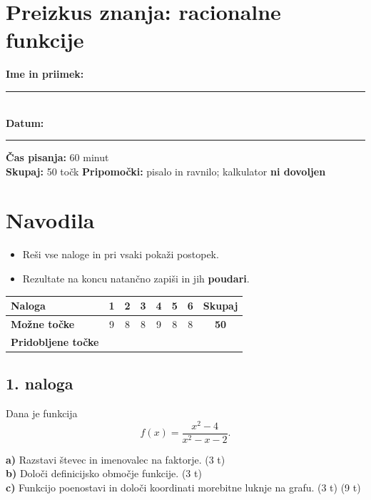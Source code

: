 \documentclass[11pt]{article}
\begin{document}
\renewcommand{\arraystretch}{1.2}

\section*{Preizkus znanja: racionalne funkcije}

\textbf{Ime in priimek:} \rule{6cm}{0.4pt}  \\
\textbf{Datum:} \rule{3cm}{0.4pt}  \hfill \textbf{Čas pisanja:} 60 minut \\
\textbf{Skupaj:} 50 točk  \hfill \textbf{Pripomočki:} pisalo in ravnilo; kalkulator \textbf{ni dovoljen}

\vspace{0.5cm}

\section*{Navodila}

\begin{itemize}
  \item Reši vse naloge in pri vsaki pokaži postopek.
  \item Rezultate na koncu natančno zapiši in jih \textbf{poudari}.
\end{itemize}
\vspace{0.2cm}

\begin{tabular}{|>{\raggedright\arraybackslash}p{2.7cm}|*{6}{c|}c|}
\hline
\textbf{Naloga} & 1 & 2 & 3 & 4 & 5 & 6 & \textbf{Skupaj} \\
\hline
\textbf{Možne točke} & 9 & 8 & 8 & 9 & 8 & 8 & \textbf{50} \\
\hline
\textbf{Pridobljene točke} &  &  &  &  &  &  &  \\
\hline
\end{tabular}

\subsection*{1. naloga}

Dana je funkcija
\[
 f(x)=\frac{x^2-4}{x^2-x-2}.
\]

\noindent\textbf{a)} Razstavi števec in imenovalec na faktorje. (3 t) \\
\noindent\textbf{b)} Določi definicijsko območje funkcije. (3 t) \\
\noindent\textbf{c)} Funkcijo poenostavi in določi koordinati morebitne luknje na grafu. (3 t) \hfill (9 t)
\end{document}

